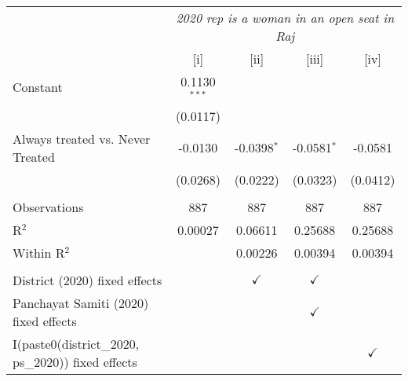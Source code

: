 
\begingroup
\centering
\begin{tabular}{lcccc}
   \toprule
    & \multicolumn{4}{c}{\textit{2020 rep is a woman in an open seat in Raj}}\\
                                                       & [i]            & [ii]          & [iii]         & [iv]\\  
   \midrule 
   Constant                                            & 0.1130$^{***}$ &               &               &   \\   
                                                       & (0.0117)       &               &               &   \\   
   Always treated vs. Never Treated                    & -0.0130        & -0.0398$^{*}$ & -0.0581$^{*}$ & -0.0581\\   
                                                       & (0.0268)       & (0.0222)      & (0.0323)      & (0.0412)\\   
    \\
   Observations                                        & 887            & 887           & 887           & 887\\  
   R$^2$                                               & 0.00027        & 0.06611       & 0.25688       & 0.25688\\  
   Within R$^2$                                        &                & 0.00226       & 0.00394       & 0.00394\\  
    \\
   District (2020) fixed effects                       &                & $\checkmark$  & $\checkmark$  & \\  
   Panchayat Samiti (2020) fixed effects               &                &               & $\checkmark$  & \\  
   I(paste0(district\_2020, ps\_2020)) fixed effects   &                &               &               & $\checkmark$\\   
   \bottomrule
\end{tabular}
\par\endgroup


